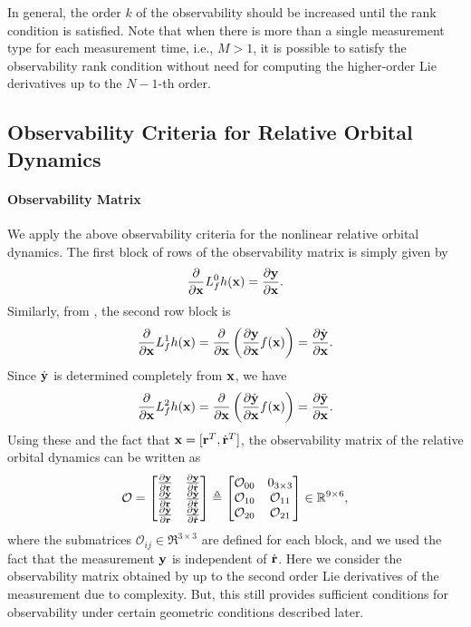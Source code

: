 In general, the order $k$ of the observability should be increased until the rank condition is satisfied. Note that when there is more than a single measurement type for each measurement time, i.e., $M>1$, it is possible to satisfy the observability rank condition without need for computing the higher-order Lie derivatives up to the $N-1$-th order.

\subsection{Observability Criteria for Relative Orbital Dynamics}

\paragraph{Observability Matrix}
We apply the above observability criteria for the nonlinear relative orbital dynamics. The first block of rows of the observability matrix is simply given by
\begin{align*}
\frac{\partial }{\partial \mathbf{x}} L_f^0 h(\mathbf{x}) = \frac{\partial \mathbf{y}}{\partial \mathbf{x}}.
\end{align*} 
Similarly, from , the second row block is
\begin{align*}
\frac{\partial }{\partial \mathbf{x}} L_f^1 h(\mathbf{x}) = \frac{\partial }{\partial \mathbf{x}}\left( \frac{\partial \mathbf{y}}{\partial \mathbf{x}}f(\mathbf{x}) \right)=\frac{\partial \dot{\mathbf{y}}}{\partial \mathbf{x}}.
\end{align*} 
Since $\dot{\mathbf{y}}$ is determined completely from $\mathbf{x}$, we have
\begin{align*}
\frac{\partial }{\partial \mathbf{x}} L_f^2 h(\mathbf{x}) = \frac{\partial }{\partial \mathbf{x}}\left( \frac{\partial \dot{\mathbf{y}}}{\partial \mathbf{x}}f(\mathbf{x}) \right)=\frac{\partial \ddot{\mathbf{y}}}{\partial \mathbf{x}}.
\end{align*}
Using these and the fact that $\mathbf{x}=[\mathbf{r}^T,\dot {\mathbf{r}}^T]$, the observability matrix of the relative orbital dynamics can be written as
\begin{align}
\mathcal{O} =
\begin{bmatrix}
\frac{\partial \mathbf{y}}{\partial \mathbf{r}} & \frac{\partial \mathbf{y}}{\partial \dot{\mathbf{r}}}\\
\frac{\partial \dot{\mathbf{y}}}{\partial \mathbf{r}} & \frac{\partial \dot{\mathbf{y}}}{\partial \dot{\mathbf{r}}}\\
\frac{\partial \ddot{\mathbf{y}}}{\partial \mathbf{r}} & \frac{\partial \ddot{\mathbf{y}}}{\partial \dot{\mathbf{r}}}
\end{bmatrix}
\triangleq
\begin{bmatrix}
\mathcal{O}_{00} & 0_{3\times 3}\\
\mathcal{O}_{10} & \mathcal{O}_{11}\\
\mathcal{O}_{20} & \mathcal{O}_{21}
\end{bmatrix}\in\mathbb{R}^{9\times 6},\label{eqn:OO}
\end{align}
where the submatrices $\mathcal{O}_{ij}\in\Re^{3\times 3}$ are defined for each block, and we used the fact that the measurement $\mathbf{y}$ is independent of $\dot{\mathbf{r}}$. Here we consider the observability matrix obtained by up to the second order Lie derivatives of the measurement due to complexity. But, this still provides sufficient conditions for observability under certain geometric conditions described later. %

